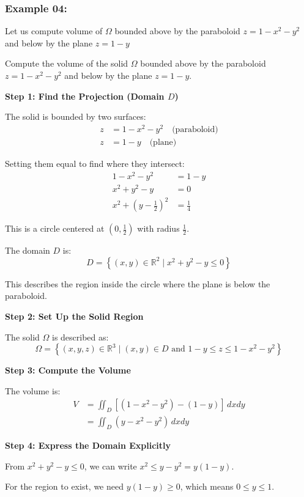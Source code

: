 \subsubsection{Example 04:}
Let us compute volume of $\Omega$ bounded above by the paraboloid $z = 1 - x^2 -y^2$ and below by the plane $z = 1-y$

Compute the volume of the solid $\Omega$ bounded above by the paraboloid $z = 1 - x^2 - y^2$ and below by the plane $z = 1 - y$.
 
 
\textbf{Step 1: Find the Projection (Domain $D$)}
 
The solid is bounded by two surfaces:
\begin{align*}
z &= 1 - x^2 - y^2 \quad \text{(paraboloid)} \\
z &= 1 - y \quad \text{(plane)}
\end{align*}
 
Setting them equal to find where they intersect:
\begin{align*}
1 - x^2 - y^2 &= 1 - y \\
x^2 + y^2 - y &= 0 \\
x^2 + \left(y - \frac{1}{2}\right)^2 &= \frac{1}{4}
\end{align*}
 
This is a circle centered at $\left(0, \frac{1}{2}\right)$ with radius $\frac{1}{2}$.
 
The domain $D$ is:
\[
D = \left\{ (x,y) \in \mathbb{R}^2 \mid x^2 + y^2 - y \leq 0 \right\}
\]
 
This describes the region inside the circle where the plane is below the paraboloid.
 
\textbf{Step 2: Set Up the Solid Region}
 
The solid $\Omega$ is described as:
\[
\Omega = \left\{ (x,y,z) \in \mathbb{R}^3 \mid (x,y) \in D \text{ and } 1-y \leq z \leq 1-x^2-y^2 \right\}
\]
 
\textbf{Step 3: Compute the Volume}
 
The volume is:
\begin{align*}
V &= \iint_D \left[(1-x^2-y^2)-(1-y)\right] \, dxdy \\
&= \iint_D (y - x^2 - y^2) \, dxdy
\end{align*}
 
\textbf{Step 4: Express the Domain Explicitly}
 
From $x^2 + y^2 - y \leq 0$, we can write $x^2 \leq y - y^2 = y(1-y)$.
 
For the region to exist, we need $y(1-y) \geq 0$, which means $0 \leq y \leq 1$.
 
